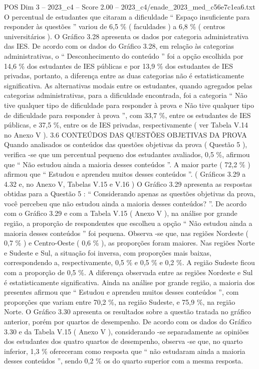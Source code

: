 \begin{textsample}{POS Dim 3 – 2023\_c4 – Score 2.00 – 2023\_c4/enade\_2023\_med\_c56e7c1ea6.txt}
O percentual de estudantes que citaram a dificuldade “ Espaço insuficiente para responder às questões ” variou de 6,5 \% ( faculdades ) a 6,8 \% ( centros universitários ).
O Gráfico 3.28 apresenta os dados por categoria administrativa das IES.
De acordo com os dados do Gráfico 3.28, em relação às categorias administrativas, o “ Desconhecimento do conteúdo ” foi a opção escolhida por 14,6 \% dos estudantes de IES públicas e por 13,9 \% dos estudantes de IES privadas, portanto, a diferença entre as duas categorias não é estatisticamente significativa.
As alternativas modais entre os estudantes, quando agregados pelas categorias administrativas, para a dificuldade encontrada, foi a categoria “ Não tive qualquer tipo de dificuldade para responder à prova e Não tive qualquer tipo de dificuldade para responder à prova ”, com 33,7 \%, entre os estudantes de IES públicas, e 37,5 \%, entre os de IES privadas, respectivamente ( ver Tabela V.14 no Anexo V ). 3.6 CONTEÚDOS DAS QUESTÕES OBJETIVAS DA PROVA Quando analisados os conteúdos das questões objetivas da prova ( Questão 5 ), verifica -se que um percentual pequeno dos estudantes avaliados, 0,5 \%, afirmou que “ Não estudou ainda a maioria desses conteúdos ”.
A maior parte ( 72,2 \% ) afirmou que “ Estudou e aprendeu muitos desses conteúdos ”. ( Gráficos 3.29 a 4.32 e, no Anexo V, Tabelas V.15 e V.16 ) O Gráfico 3.29 apresenta as respostas obtidas para a Questão 5 : “ Considerando apenas as questões objetivas da prova, você percebeu que não estudou ainda a maioria desses conteúdos? ”.
De acordo com o Gráfico 3.29 e com a Tabela V.15 ( Anexo V ), na análise por grande região, a proporção de respondentes que escolheu a opção “ Não estudou ainda a maioria desses conteúdos ” foi pequena.
Observa -se que, nas regiões Nordeste ( 0,7 \% ) e Centro-Oeste ( 0,6 \% ), as proporções foram maiores.
Nas regiões Norte e Sudeste e Sul, a situação foi inversa, com proporções mais baixas, correspondendo a, respectivamente, 0,5 \% e 0,5 \% e 0,2 \%.
A região Sudeste ficou com a proporção de 0,5 \%.
A diferença observada entre as regiões Nordeste e Sul é estatisticamente significativa.
Ainda na análise por grande região, a maioria dos presentes afirmou que “ Estudou e aprendeu muitos desses conteúdos ”, com proporções que variam entre 70,2 \%, na região Sudeste, e 75,9 \%, na região Norte.
O Gráfico 3.30 apresenta os resultados sobre a questão tratada no gráfico anterior, porém por quartos de desempenho.
De acordo com os dados do Gráfico 3.30 e da Tabela V.15 ( Anexo V ), considerando -se separadamente as opiniões dos estudantes dos quatro quartos de desempenho, observa -se que, no quarto inferior, 1,3 \% ofereceram como resposta que “ não estudaram ainda a maioria desses conteúdos ”, sendo 0,2 \% os do quarto superior com a mesma resposta.

\end{textsample}
